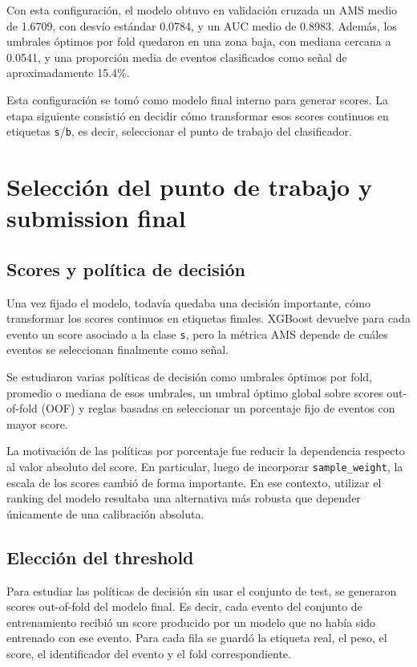 \documentclass{article}
\begin{document}
Con esta configuración, el modelo obtuvo en validación cruzada un AMS medio de 1.6709, con desvío estándar 0.0784, y un AUC medio de 0.8983. Además, los umbrales óptimos por fold quedaron en una zona baja, con mediana cercana a 0.0541, y una proporción media de eventos clasificados como señal de aproximadamente 15.4\%.

Esta configuración se tomó como modelo final interno para generar scores. La etapa siguiente consistió en decidir cómo transformar esos scores continuos en etiquetas \texttt{s}/\texttt{b}, es decir, seleccionar el punto de trabajo del clasificador.

\section{Selección del punto de trabajo y submission final}
\subsection{Scores y política de decisión}
Una vez fijado el modelo, todavía quedaba una decisión importante, cómo transformar los scores continuos en etiquetas finales. XGBoost devuelve para cada evento un score asociado a la clase \texttt{s}, pero la métrica AMS depende de cuáles eventos se seleccionan finalmente como señal.

Se estudiaron varias políticas de decisión como umbrales óptimos por fold, promedio o mediana de esos umbrales, un umbral óptimo global sobre scores out-of-fold (OOF) y reglas basadas en seleccionar un porcentaje fijo de eventos con mayor score.

La motivación de las políticas por porcentaje fue reducir la dependencia respecto al valor absoluto del score. En particular, luego de incorporar \texttt{sample\_weight}, la escala de los scores cambió de forma importante. En ese contexto, utilizar el ranking del modelo resultaba una alternativa más robusta que depender únicamente de una calibración absoluta.

\subsection{Elección del threshold}
Para estudiar las políticas de decisión sin usar el conjunto de test, se generaron scores out-of-fold del modelo final. Es decir, cada evento del conjunto de entrenamiento recibió un score producido por un modelo que no había sido entrenado con ese evento. Para cada fila se guardó la etiqueta real, el peso, el score, el identificador del evento y el fold correspondiente.
\end{document}
